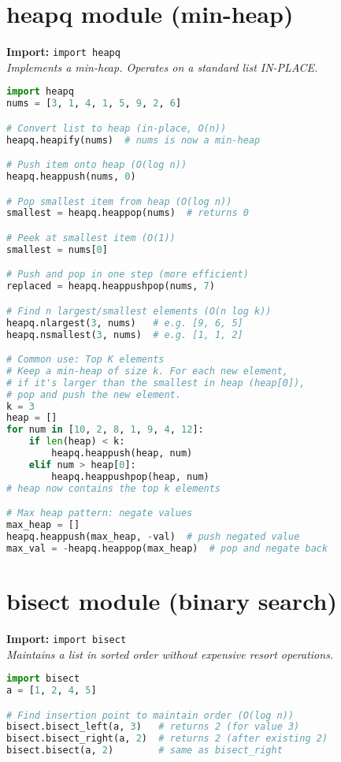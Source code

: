 \documentclass[8pt,landscape]{article}
\begin{document}
\begin{multicols}{3}
\section*{heapq module (min-heap)}
\textbf{Import:} \lstinline|import heapq| \\
\textit{Implements a min-heap. Operates on a standard list IN-PLACE.}
\begin{lstlisting}[language=Python]
import heapq
nums = [3, 1, 4, 1, 5, 9, 2, 6]

# Convert list to heap (in-place, O(n))
heapq.heapify(nums)  # nums is now a min-heap

# Push item onto heap (O(log n))
heapq.heappush(nums, 0)

# Pop smallest item from heap (O(log n))
smallest = heapq.heappop(nums)  # returns 0

# Peek at smallest item (O(1))
smallest = nums[0]

# Push and pop in one step (more efficient)
replaced = heapq.heappushpop(nums, 7)

# Find n largest/smallest elements (O(n log k))
heapq.nlargest(3, nums)   # e.g. [9, 6, 5]
heapq.nsmallest(3, nums)  # e.g. [1, 1, 2]

# Common use: Top K elements
# Keep a min-heap of size k. For each new element,
# if it's larger than the smallest in heap (heap[0]),
# pop and push the new element.
k = 3
heap = []
for num in [10, 2, 8, 1, 9, 4, 12]:
    if len(heap) < k:
        heapq.heappush(heap, num)
    elif num > heap[0]:
        heapq.heappushpop(heap, num)
# heap now contains the top k elements

# Max heap pattern: negate values
max_heap = []
heapq.heappush(max_heap, -val)  # push negated value
max_val = -heapq.heappop(max_heap)  # pop and negate back
\end{lstlisting}

\section*{bisect module (binary search)}
\textbf{Import:} \lstinline|import bisect| \\
\textit{Maintains a list in sorted order without expensive resort operations.}
\begin{lstlisting}[language=Python]
import bisect
a = [1, 2, 4, 5]

# Find insertion point to maintain order (O(log n))
bisect.bisect_left(a, 3)   # returns 2 (for value 3)
bisect.bisect_right(a, 2)  # returns 2 (after existing 2)
bisect.bisect(a, 2)        # same as bisect_right


\end{lstlisting}
\end{multicols}
\end{document}
